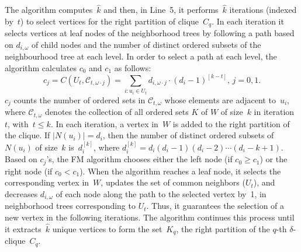 


The algorithm computes~$\hat{k}$ and then, in Line~5, it performs~$\hat{k}$ iterations
(indexed by~$t$) to select vertices for the right partition of clique~$C_q$. In each iteration it selects vertices at leaf nodes of the neighborhood trees by following a path based on $d_{i, \omega}$ of child nodes and the number of distinct ordered subsets of the neighbourhood tree at each level. In order to select a path at each level, the algorithm calculates $c_{0}$ and $c_{1}$ as follows: 
\begin{equation}
c_{j} = C\left(U_t, \mathscr{C}_{t, \omega \cdot j}\right)=\sum_{i:{u_{i} \in U_{t}}} d_{i, \omega \cdot j} \cdot\left(d_{i}-1\right)^{[{k}-t]},  \, j= 0,1.  \label{eq:c01}
\end{equation}
$c_{j}$ counts the number of ordered sets in $\mathscr{C}_{t, \omega}$ whose elements are adjacent to~$u_{i}$, where $\mathscr{C}_{t, \omega}$ denotes the collection of all ordered sets $K$ of $W$ of size~$k$ in iteration~$t$, with~$t \leq k$. In each iteration, a vertex 
in~$W$ is added to the right partition of the clique. 
If $|N(u_{i})|=d_{i}$, then the number of distinct ordered subsets of $N(u_{i})$ of size~$k$ is~$d_{i}^{[k]}$, where  $d_{i}^{[k]} = d_{i}(d_{i}-1)(d_{i}-2) \cdots(d_{i}-k+1)$. Based on $c_{j}$'s, the \textsf{FM} algorithm chooses either the left node (if $c_{0} \geq c_{1}$) 
or the right node (if $c_{0} < c_{1}$). When the algorithm reaches a leaf node, it selects the corresponding vertex in~$W$, updates the set of common neighbors ($U_{t}$), and decreases $d_{i, \omega}$ of each node along the path to the selected vertex by~1, in  neighborhood trees corresponding to $U_{t}$.
Thus, it guarantees the selection of a new vertex in the following iterations. The algorithm continues this process until it extracts~$\hat{k}$ unique vertices to form the set~$K_q$, the right partition of the $q$-th $\delta$-clique~$C_q$. 



